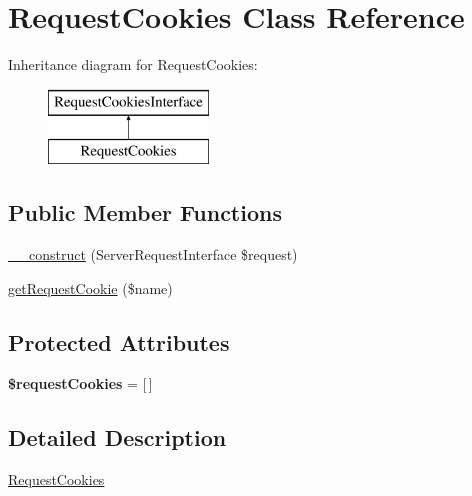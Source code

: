 \hypertarget{class_pes_1_1_http_1_1_cookies_1_1_request_cookies}{}\section{Request\+Cookies Class Reference}
\label{class_pes_1_1_http_1_1_cookies_1_1_request_cookies}
Inheritance diagram for Request\+Cookies\+:\begin{figure}[H]
\begin{center}
\leavevmode
\includegraphics[height=2.000000cm]{class_pes_1_1_http_1_1_cookies_1_1_request_cookies}
\end{center}
\end{figure}
\subsection*{Public Member Functions}
\begin{DoxyCompactItemize}
\item 
\mbox{\hyperlink{class_pes_1_1_http_1_1_cookies_1_1_request_cookies_a05f4ca5241eacefce6401fa65704c14a}{\+\_\+\+\_\+construct}} (Server\+Request\+Interface \$request)
\item 
\mbox{\hyperlink{class_pes_1_1_http_1_1_cookies_1_1_request_cookies_ae729ed33564f742b4a057d3caded9677}{get\+Request\+Cookie}} (\$name)
\end{DoxyCompactItemize}
\subsection*{Protected Attributes}
\begin{DoxyCompactItemize}
\item 
\mbox{\label{class_pes_1_1_http_1_1_cookies_1_1_request_cookies_a51c230c508683f5a1a3b5f6583287322}} 
{\bfseries \$request\+Cookies} = \mbox{[}$\,$\mbox{]}
\end{DoxyCompactItemize}


\subsection{Detailed Description}
\mbox{\hyperlink{class_pes_1_1_http_1_1_cookies_1_1_request_cookies}{Request\+Cookies}} 

